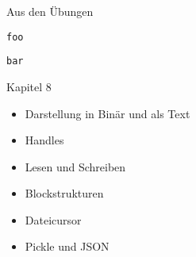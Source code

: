 \begin{frame}[fragile]{Aus den Übungen}
%
\begin{tcbraster}[raster columns=2,
                  raster equal height,
                  nobeforeafter,
                  raster column skip=0.5cm]
\begin{codebox}
\begin{verbatim}
foo
\end{verbatim}
\end{codebox}
%
\begin{codebox}
\begin{verbatim}
bar
\end{verbatim}
\end{codebox}
\end{tcbraster}
%
\end{frame}


\begin{frame}[fragile]{Kapitel 8}
%
\begin{itemize}
\item Darstellung in Binär und als Text
\item Handles
\item Lesen und Schreiben
\item Blockstrukturen 
\item Dateicursor
\item Pickle und JSON
\end{itemize}
%
\end{frame}


